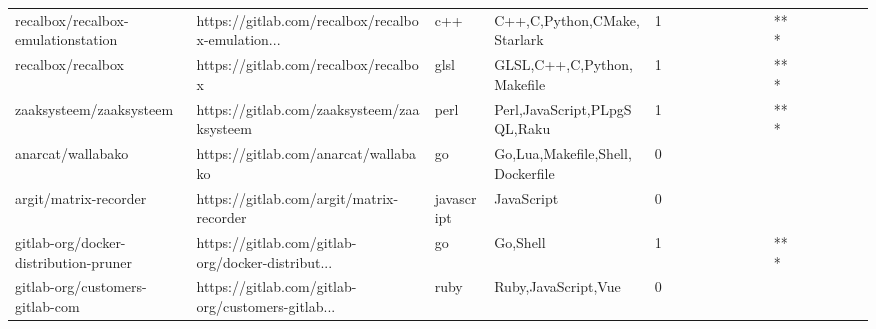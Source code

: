\begin{tabular}{llllrlllllllllllll}
recalbox/recalbox-emulationstation                 &  https://gitlab.com/recalbox/recalbox-emulation... &               c++ &                        C++,C,Python,CMake,Starlark &       1 &         &        &           &                &                 &        &           &       *** &          &          &       &              &          \\
recalbox/recalbox                                  &               https://gitlab.com/recalbox/recalbox &              glsl &                         GLSL,C++,C,Python,Makefile &       1 &         &        &           &                &                 &        &           &       *** &          &          &       &              &          \\
zaaksysteem/zaaksysteem                            &         https://gitlab.com/zaaksysteem/zaaksysteem &              perl &                       Perl,JavaScript,PLpgSQL,Raku &       1 &         &        &           &                &                 &        &           &       *** &          &          &       &              &          \\
anarcat/wallabako                                  &               https://gitlab.com/anarcat/wallabako &                go &                   Go,Lua,Makefile,Shell,Dockerfile &       0 &         &        &           &                &                 &        &           &           &          &          &       &              &          \\
argit/matrix-recorder                              &           https://gitlab.com/argit/matrix-recorder &        javascript &                                         JavaScript &       0 &         &        &           &                &                 &        &           &           &          &          &       &              &          \\
gitlab-org/docker-distribution-pruner              &  https://gitlab.com/gitlab-org/docker-distribut... &                go &                                           Go,Shell &       1 &         &        &           &                &                 &        &           &       *** &          &          &       &              &          \\
gitlab-org/customers-gitlab-com                    &  https://gitlab.com/gitlab-org/customers-gitlab... &              ruby &                                Ruby,JavaScript,Vue &       0 &         &        &           &                &                 &        &           &           &          &          &       &              &          \\

\end{tabular}
